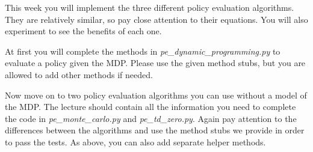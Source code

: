 \documentclass{exam}
\begin{document}
\noindent
This week you will implement the three different policy evaluation algorithms. They are relatively similar, so pay close attention to their equations. You will also experiment to see the benefits of each one.

\begin{questions}
	At first you will complete the methods in \emph{pe\_dynamic\_programming.py} to evaluate a policy given the MDP.  Please use the given method stubs, but you are allowed to add other methods if needed.  
	
	Now move on to two policy evaluation algorithms you can use without a model of the MDP.  The lecture should contain all the information you need to complete the code in \emph{pe\_monte\_carlo.py} and \emph{pe\_td\_zero.py}. Again pay attention to the differences between the algorithms and use the method stubs we provide in order to pass the tests. As above, you can also add separate helper methods.
\end{questions}
\end{document}
